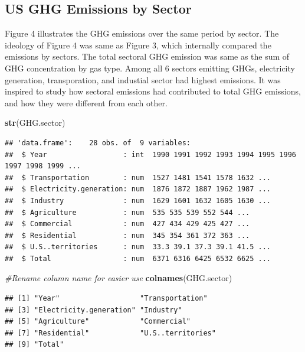 \documentclass[12pt,]{article}
\newenvironment{Shaded}{\begin{snugshade}}{\end{snugshade}}
\newcommand{\KeywordTok}[1]{\textcolor[rgb]{0.13,0.29,0.53}{\textbf{#1}}}
\newcommand{\CommentTok}[1]{\textcolor[rgb]{0.56,0.35,0.01}{\textit{#1}}}
\newcommand{\NormalTok}[1]{#1}
\begin{document}
\newpage

\subsection{US GHG Emissions by
Sector}\label{us-ghg-emissions-by-sector}

Figure 4 illustrates the GHG emissions over the same period by sector.
The ideology of Figure 4 was same as Figure 3, which internally compared
the emissions by sectors. The total sectoral GHG emission was same as
the sum of GHG concentration by gas type. Among all 6 sectors emitting
GHGs, electricity generation, transporation, and industial sector had
highest emissions. It was inspired to study how sectoral emissions had
contributed to total GHG emissions, and how they were different from
each other.

\begin{Shaded}
\begin{Highlighting}[]
\KeywordTok{str}\NormalTok{(GHG.sector)}
\end{Highlighting}
\end{Shaded}

\begin{verbatim}
## 'data.frame':    28 obs. of  9 variables:
##  $ Year                  : int  1990 1991 1992 1993 1994 1995 1996 1997 1998 1999 ...
##  $ Transportation        : num  1527 1481 1541 1578 1632 ...
##  $ Electricity.generation: num  1876 1872 1887 1962 1987 ...
##  $ Industry              : num  1629 1601 1632 1605 1630 ...
##  $ Agriculture           : num  535 535 539 552 544 ...
##  $ Commercial            : num  427 434 429 425 427 ...
##  $ Residential           : num  345 354 361 372 363 ...
##  $ U.S..territories      : num  33.3 39.1 37.3 39.1 41.5 ...
##  $ Total                 : num  6371 6316 6425 6532 6625 ...
\end{verbatim}

\begin{Shaded}
\begin{Highlighting}[]
\CommentTok{#Rename column name for easier use}
\KeywordTok{colnames}\NormalTok{(GHG.sector)}
\end{Highlighting}
\end{Shaded}

\begin{verbatim}
## [1] "Year"                   "Transportation"        
## [3] "Electricity.generation" "Industry"              
## [5] "Agriculture"            "Commercial"            
## [7] "Residential"            "U.S..territories"      
## [9] "Total"
\end{verbatim}
\end{document}
